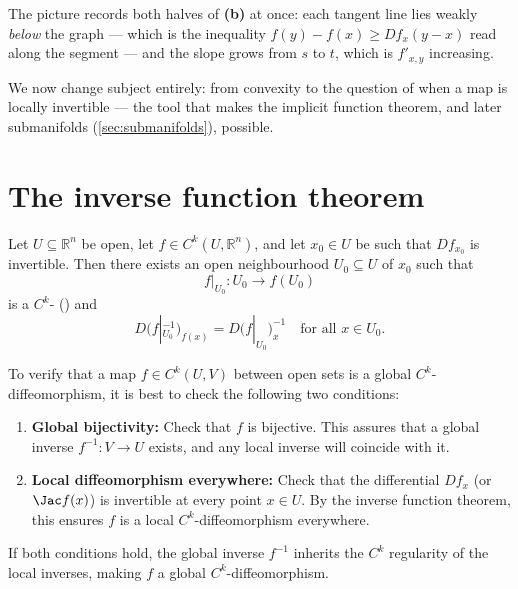 The picture records both halves of \textbf{(b)} at once: each tangent line lies weakly
\emph{below} the graph --- which is the inequality $f(y)-f(x) \geq Df_x(y-x)$ read along the
segment --- and the slope grows from $s$ to $t$, which is $f'_{x,y}$ increasing.

We now change subject entirely: from convexity to the question of when a map is locally
invertible --- the tool that makes the implicit function theorem, and later submanifolds
(\cref{sec:submanifolds}), possible.

\section{The inverse function theorem}
\label{sec:inverse_function_theorem}

\begin{theorem}
\label{thm:inverse_function_theorem}
Let $U \subseteq \mathbb{R}^n$ be open, let $f \in C^k(U,\mathbb{R}^n)$, and let $x_0 \in U$ be
such that $Df_{x_0}$ is invertible. Then there exists an open neighbourhood $U_0 \subseteq U$ of
$x_0$ such that
\[f|_{U_0} : U_0 \to f(U_0)\]
is a $C^k$- () and
\[D\big(f|_{U_0}^{-1}\big)_{f(x)} = D\big(f|_{U_0}\big)_x^{-1} \quad \text{for all } x \in U_0.\]
\end{theorem}

\begin{remark}
\label{rem:global_diffeomorphism_check}
To verify that a map $f \in C^k(U, V)$ between open sets is a global $C^k$-diffeomorphism, it is best to check the following two conditions:
\begin{enumerate}
  \item \textbf{Global bijectivity:} Check that $f$ is bijective. This assures that a global inverse $f^{-1} : V \to U$ exists, and any local inverse will coincide with it.
  \item \textbf{Local diffeomorphism everywhere:} Check that the differential $Df_x$ (or $\Jac f(x)$) is invertible at every point $x \in U$. By the inverse function theorem, this ensures $f$ is a local $C^k$-diffeomorphism everywhere.
\end{enumerate}
If both conditions hold, the global inverse $f^{-1}$ inherits the $C^k$ regularity of the local inverses, making $f$ a global $C^k$-diffeomorphism.
\end{remark}

